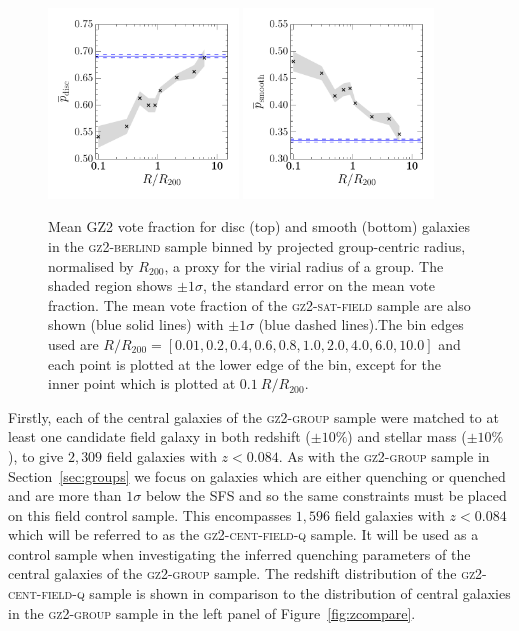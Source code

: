 \documentclass[useAMS,usenatbib]{mn2e}
\begin{document}
\begin{figure}
\includegraphics[width=0.45\textwidth]{p_disc_trend_with_log_radius_field_compare.pdf}
\includegraphics[width=0.45\textwidth]{p_smooth_trend_with_log_radius_field_compare.pdf}
\caption[Mean $p_d$ and $p_s$ with group radius in the \textsc{gz2-berlind} sample]{Mean GZ2 vote fraction for disc (top) and smooth (bottom) galaxies in the \textsc{gz2-berlind} sample binned by projected group-centric radius, normalised by $R_{200}$, a proxy for the virial radius of a group. The shaded region shows $\pm1\sigma$, the standard error on the mean vote fraction. The mean vote fraction of the \textsc{gz2-sat-field} sample are also shown (blue solid lines) with $\pm1\sigma$ (blue dashed lines).The bin edges used are $R/R_{200} =  [0.01 ,   0.2,   0.4,   0.6,   0.8,   1.0 ,   2.0 ,   4.0 ,   6.0 ,  10.0]$ and each point is plotted at the lower edge of the bin, except for the inner point which is plotted at $0.1~R/R_{200}$.}
\label{fig:morphradius}
\end{figure}

Firstly, each of the central galaxies of the \textsc{gz2-group} sample were matched to at least one candidate field galaxy in both redshift ($\pm10\%$) and stellar mass ($\pm10\%$), to give $2,309$ field galaxies with $z < 0.084$. As with the \textsc{gz2-group} sample in Section~\ref{sec:groups} we focus on galaxies which are either quenching or quenched and are more than $1\sigma$ below the SFS and so the same constraints must be placed on this field control sample. This encompasses $1,596$ field galaxies with $z < 0.084$ which will be referred to as the \textsc{gz2-cent-field-q} sample. It will be used as a control sample when investigating the inferred quenching parameters of the central galaxies of the \textsc{gz2-group} sample. The redshift distribution of the \textsc{gz2-cent-field-q} sample is shown in comparison to the distribution of central galaxies in the \textsc{gz2-group} sample in the left panel of Figure~\ref{fig:zcompare}. 
\end{document}
